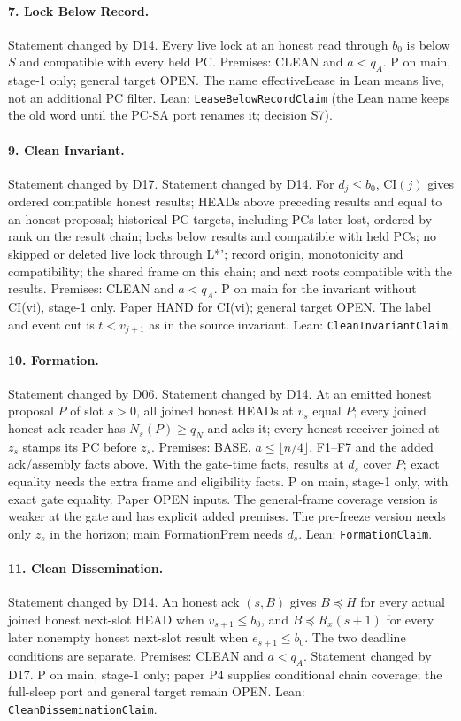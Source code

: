 \documentclass{article}
\newcommand{\nm}[1]{\nolinkurl{#1}}
\begin{document}
\paragraph{7. Lock Below Record.}
Statement changed by D14.
Every live lock at an honest read through $b_0$ is below $S$ and compatible with every held PC. Premises: CLEAN and $a<q_A$. P on main, stage-1 only; general target OPEN. The name effectiveLease in Lean means live, not an additional PC filter.
Lean: \nm{LeaseBelowRecordClaim} (the Lean name keeps the old word until the PC-SA port renames it; decision S7).

\paragraph{9. Clean Invariant.}
Statement changed by D17.
Statement changed by D14.
For $d_j\leq b_0$, CI$(j)$ gives ordered compatible honest results; HEADs above preceding results and equal to an honest proposal; historical PC targets, including PCs later lost, ordered by rank on the result chain; locks below results and compatible with held PCs; no skipped or deleted live lock through L*'; record origin, monotonicity and compatibility; the shared frame on this chain; and next roots compatible with the results. Premises: CLEAN and $a<q_A$. P on main for the invariant without CI(vi), stage-1 only. Paper HAND for CI(vi); general target OPEN. The label and event cut is $t<v_{j+1}$ as in the source invariant.
Lean: \nm{CleanInvariantClaim}.

\paragraph{10. Formation.}
Statement changed by D06. Statement changed by D14.
At an emitted honest proposal $P$ of slot $s>0$, all joined honest HEADs at $v_s$ equal $P$; every joined honest ack reader has $N_s(P)\geq q_N$ and acks it; every honest receiver joined at $z_s$ stamps its PC before $z_s$. Premises: BASE, $a\leq\lfloor n/4\rfloor$, F1--F7 and the added ack/assembly facts above. With the gate-time facts, results at $d_s$ cover $P$; exact equality needs the extra frame and eligibility facts. P on main, stage-1 only, with exact gate equality. Paper OPEN inputs. The general-frame coverage version is weaker at the gate and has explicit added premises. The pre-freeze version needs only $z_s$ in the horizon; main FormationPrem needs $d_s$.
Lean: \nm{FormationClaim}.

\paragraph{11. Clean Dissemination.}
Statement changed by D14.
An honest ack $(s,B)$ gives $B\preceq H$ for every actual joined honest next-slot HEAD when $v_{s+1}\leq b_0$, and $B\preceq R_x(s+1)$ for every later nonempty honest next-slot result when $e_{s+1}\leq b_0$. The two deadline conditions are separate. Premises: CLEAN and $a<q_A$. Statement changed by D17. P on main, stage-1 only; paper P4 supplies conditional chain coverage; the full-sleep port and general target remain OPEN.
Lean: \nm{CleanDisseminationClaim}.
\end{document}
